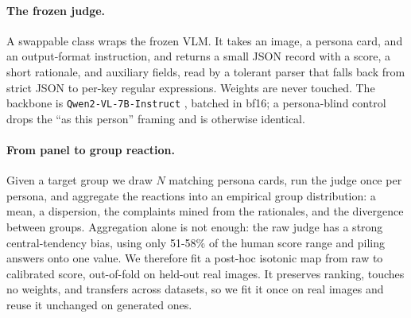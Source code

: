 \documentclass{article}
\begin{document}
\paragraph{The frozen judge.} A swappable class wraps the frozen VLM. It takes an image, a persona card, and an output-format instruction, and returns a small JSON record with a score, a short rationale, and auxiliary fields, read by a tolerant parser that falls back from strict JSON to per-key regular expressions. Weights are never touched. The backbone is \texttt{Qwen2-VL-7B-Instruct} \citep{wang2024qwen2vl}, batched in bf16; a persona-blind control drops the ``as this person'' framing and is otherwise identical.

\paragraph{From panel to group reaction.} Given a target group we draw $N$ matching persona cards, run the judge once per persona, and aggregate the reactions into an empirical group distribution: a mean, a dispersion, the complaints mined from the rationales, and the divergence between groups. Aggregation alone is not enough: the raw judge has a strong central-tendency bias, using only 51-58\% of the human score range and piling answers onto one value. We therefore fit a post-hoc isotonic map \citep{niculescu2005} from raw to calibrated score, out-of-fold on held-out real images. It preserves ranking, touches no weights, and transfers across datasets, so we fit it once on real images and reuse it unchanged on generated ones.
\end{document}
